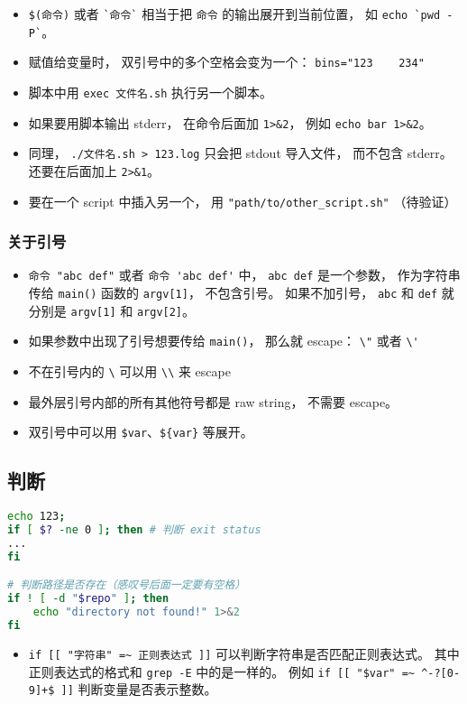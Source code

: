 \begin{itemize}
\item \verb|$(命令)| 或者 \verb|`命令`| 相当于把 \verb|命令| 的输出展开到当前位置， 如 \verb|echo `pwd -P`|。
\item 赋值给变量时， 双引号中的多个空格会变为一个： \verb|bins="123    234"|
\item 脚本中用 \verb|exec 文件名.sh| 执行另一个脚本。
\item 如果要用脚本输出 stderr， 在命令后面加 \verb|1>&2|， 例如 \verb|echo bar 1>&2|。
\item 同理， \verb|./文件名.sh > 123.log| 只会把 stdout 导入文件， 而不包含 stderr。 还要在后面加上 \verb|2>&1|。
\item 要在一个 script 中插入另一个， 用 \verb|"path/to/other_script.sh"| （待验证）
\end{itemize}

\subsubsection{关于引号}
\begin{itemize}
\item \verb|命令 "abc def"| 或者 \verb|命令 'abc def'| 中， \verb|abc def| 是一个参数， 作为字符串传给 \verb|main()| 函数的 \verb|argv[1]|， 不包含引号。 如果不加引号， \verb|abc| 和 \verb|def| 就分别是 \verb|argv[1]| 和 \verb|argv[2]|。
\item 如果参数中出现了引号想要传给 \verb|main()|， 那么就 escape： \verb|\"| 或者 \verb|\'|
\item 不在引号内的 \verb|\| 可以用 \verb|\\| 来 escape
\item 最外层引号内部的所有其他符号都是 raw string， 不需要 escape。
\item 双引号中可以用 \verb|$var|、\verb|${var}| 等展开。
\end{itemize}


\subsection{判断}
\begin{lstlisting}[language=bash]
echo 123;
if [ $? -ne 0 ]; then # 判断 exit status
...
fi

# 判断路径是否存在（感叹号后面一定要有空格）
if ! [ -d "$repo" ]; then
    echo "directory not found!" 1>&2
fi
\end{lstlisting}
\begin{itemize}
\item \verb|if [[ "字符串" =~ 正则表达式 ]]| 可以判断字符串是否匹配正则表达式。 其中正则表达式的格式和 \verb|grep -E| 中的是一样的。 例如 \verb|if [[ "$var" =~ ^-?[0-9]+$ ]]| 判断变量是否表示整数。
\end{itemize}

